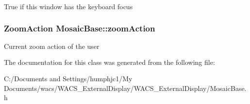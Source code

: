 \label{class_mosaic_base_a2c756e948372a8b472527b20fd80c6b6}
True if this window has the keyboard focus \hypertarget{class_mosaic_base_afb5a97e1bb4327d259143054c3a95c41}{
\subsubsection[{zoomAction}]{\setlength{\rightskip}{0pt plus 5cm}ZoomAction {\bf MosaicBase::zoomAction}}}
\label{class_mosaic_base_afb5a97e1bb4327d259143054c3a95c41}
Current zoom action of the user 

The documentation for this class was generated from the following file:\begin{DoxyCompactItemize}
\item 
C:/Documents and Settings/humphjc1/My Documents/wacs/WACS\_\-ExternalDisplay/WACS\_\-ExternalDisplay/MosaicBase.h\end{DoxyCompactItemize}
